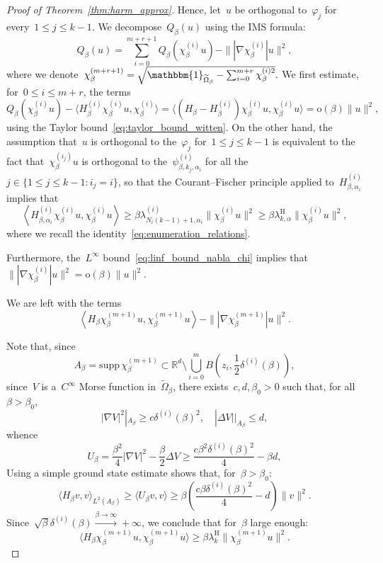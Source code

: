\documentclass[10pt]{article}
\newcommand{\R}{\mathbb{R}}
\newcommand{\1}{\mathbbm 1}
\newcommand{\supp}{\mathrm{supp}}
\newcommand{\deltai}{\delta^{(i)}}
\begin{document}
\begin{proof}[Proof of Theorem~\ref{thm:harm_approx}]
        Hence, let~$u$ be orthogonal to~$\varphi_j$ for every~$1\leq j \leq k-1$. We decompose~$Q_\beta(u)$ using the IMS formula:
        \[Q_\beta(u) = \sum_{i=0}^{m+r+1} Q_\beta(\chi_\beta^{(i)}u) - \||\nabla \chi_\beta^{(i)}|u\|^2,\]
        where we denote~$\chi_\beta^{(m+r+1)} = \sqrt{\mathbbm{1}_{\widetilde\Omega_\beta}-\sum_{i=0}^{m+r}\chi_\beta^{(i)2}}.$
        We first estimate, for~$0\leq i \leq m+r$, the terms
        \begin{equation}
            Q_\beta(\chi_\beta^{(i)}u)-\langle H_\beta^{(i)}\chi_\beta^{(i)}u,\chi_\beta^{(i)}\rangle = \langle (H_\beta-H_\beta^{(i)})\chi_\beta^{(i)}u,\chi_\beta^{(i)}u\rangle = \mathrm o(\beta)\|u\|^2,
        \end{equation}
        using the Taylor bound~\eqref{eq:taylor_bound_witten}.
        On the other hand, the assumption that~$u$ is orthogonal to the~$\varphi_j$ for~$1\leq j \leq k-1$ is equivalent to the fact that~$\chi_\beta^{(i_j)}u$ is orthogonal to the~$\psi_{\beta,k_j,\alpha_{i}}^{(i)}$ for all the~$j \in \{1\leq j \leq k-1 : i_j=i\}$, so that the Courant--Fischer principle applied to~$H_{\beta,\alpha_i}^{(i)}$
        implies that
        \begin{equation}
            \left\langle H_{\beta,\alpha_i}^{(i)}\chi_\beta^{(i)}u,\chi_\beta^{(i)}u\right\rangle \geq \beta\lambda_{N_i(k-1)+1,\alpha_i}^{(i)}\|\chi_\beta^{(i)}u\|^2\geq \beta \lambda_{k,\alpha}^{\mathrm H}\|\chi_\beta^{(i)}u\|^2,
        \end{equation}
        where we recall the identity~\eqref{eq:enumeration_relations}.

        Furthermore, the~$L^\infty$ bound~\eqref{eq:linf_bound_nabla_chi} implies that~$\||\nabla\chi_\beta^{(i)}|u\|^2 = \mathrm{o}(\beta)\|u\|^2$.

        We are left with the terms
        \[\left\langle H_\beta \chi_\beta^{(m+1)}u,\chi_\beta^{(m+1)}u\right\rangle - \||\nabla \chi_\beta^{(m+1)}|u\|^2.\]

        Note that, since
       ~$$ A_\beta = \supp\,\chi_\beta^{(m+1)} \subset \R^d\setminus \bigcup_{i=0}^m B\left(z_i,\frac12\deltai(\beta)\right),$$
        since~$V$ is a~$C^\infty$ Morse function in~$\widetilde \Omega_\beta$, there exists~$c,d,\beta_0>0$ such that, for all~$\beta>\beta_0$,
        \[|\nabla V|^2 |_{A_\beta} \geq c\deltai(\beta)^2,\quad |\Delta V| |_{A_\beta} \leq d,\]
        whence 
        \[U_\beta=\frac{\beta^2}4|\nabla V|^2 -\frac\beta 2 \Delta V \geq  \frac{c\beta^2 \deltai(\beta)^2}{4}-\beta d,\]
        Using a simple ground state estimate shows that, for~$\beta>\beta_0$:
        \[\langle H_\beta v,v\rangle_{L^2(A_\beta)} \geq \langle U_\beta v,v\rangle \geq \beta\left(\frac{c\beta\deltai(\beta)^2}{4}-d\right)\|v\|^2.\]
        Since~$\sqrt\beta\deltai(\beta)\overset{\beta\to\infty}{\longrightarrow} +\infty$, we conclude that for~$\beta$ large enough:
        \[\langle H_\beta \chi_\beta^{(m+1)}u,\chi_\beta^{(m+1)}u\rangle \geq \beta\lambda_k^{\mathrm{H}}\|\chi_\beta^{(m+1)}u\|^2.\]


\end{proof}
\end{document}
